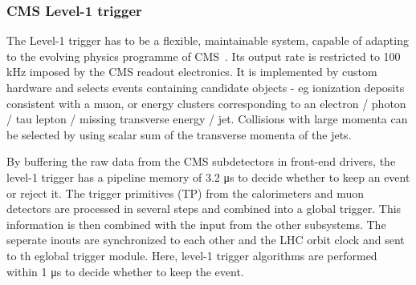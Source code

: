 \subsubsection*{CMS Level-1 trigger}
The Level-1 trigger has to be a flexible, maintainable system, capable of adapting to the evolving physics programme of CMS~\cite{Khachatryan:2016bia}. Its output rate is restricted to 100 \si{ \kilo \hertz} imposed by the CMS readout electronics. It is implemented by custom hardware and selects events containing candidate objects - eg ionization deposits consistent with a muon, or energy clusters corresponding to an electron / photon / tau lepton / missing transverse energy / jet. Collisions with large momenta can be selected by using scalar sum of the transverse momenta of the jets. 

By buffering the raw data from the CMS subdetectors in front-end drivers, the level-1 trigger has a pipeline memory of 3.2 \si{ \micro \second} to decide whether to keep an event or reject it. 
The trigger primitives (TP) from the calorimeters and muon detectors are processed in several steps and combined into a global trigger. This information is then combined with the input from the other subsystems. The seperate inouts are synchronized to each other and the LHC orbit clock and sent to th eglobal trigger module. Here, level-1 trigger algorithms are performed within 1 \si{ \micro \second} to decide whether to  keep the event. 

